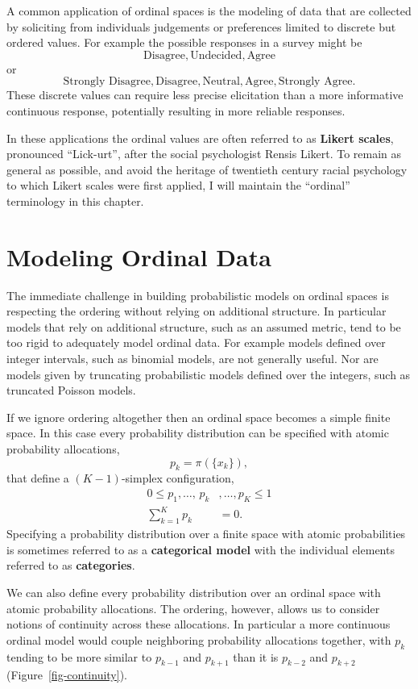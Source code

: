 \documentclass[
  letterpaper,
  DIV=11,
  numbers=noendperiod]{scrartcl}
\begin{document}
A common application of ordinal spaces is the modeling of data that are
collected by soliciting from individuals judgements or preferences
limited to discrete but ordered values. For example the possible
responses in a survey might be \[
\text{Disagree}, \text{Undecided}, \text{Agree}
\] or \[
\text{Strongly Disagree}, \text{Disagree},
\text{Neutral},
\text{Agree}, \text{Strongly Agree}.
\] These discrete values can require less precise elicitation than a
more informative continuous response, potentially resulting in more
reliable responses.

In these applications the ordinal values are often referred to as
\textbf{Likert scales}, pronounced ``Lick-urt'', after the social
psychologist Rensis Likert. To remain as general as possible, and avoid
the heritage of twentieth century racial psychology to which Likert
scales were first applied, I will maintain the ``ordinal'' terminology
in this chapter.

\section{Modeling Ordinal Data}\label{modeling-ordinal-data}

The immediate challenge in building probabilistic models on ordinal
spaces is respecting the ordering without relying on additional
structure. In particular models that rely on additional structure, such
as an assumed metric, tend to be too rigid to adequately model ordinal
data. For example models defined over integer intervals, such as
binomial models, are not generally useful. Nor are models given by
truncating probabilistic models defined over the integers, such as
truncated Poisson models.

If we ignore ordering altogether then an ordinal space becomes a simple
finite space. In this case every probability distribution can be
specified with atomic probability allocations, \[
p_{k} = \pi( \{ x_{k} \} ),
\] that define a \((K - 1)\)-simplex configuration, \begin{align*}
0 \le p_{1}, \ldots, \, p_{k}&, \ldots, p_{K} \le 1
\\
\sum_{k = 1}^{K} p_{k}& = 0.
\end{align*} Specifying a probability distribution over a finite space
with atomic probabilities is sometimes referred to as a
\textbf{categorical model} with the individual elements referred to as
\textbf{categories}.

We can also define every probability distribution over an ordinal space
with atomic probability allocations. The ordering, however, allows us to
consider notions of continuity across these allocations. In particular a
more continuous ordinal model would couple neighboring probability
allocations together, with \(p_{k}\) tending to be more similar to
\(p_{k - 1}\) and \(p_{k + 1}\) than it is \(p_{k - 2}\) and
\(p_{k + 2}\) (Figure~\ref{fig-continuity}).
\end{document}
